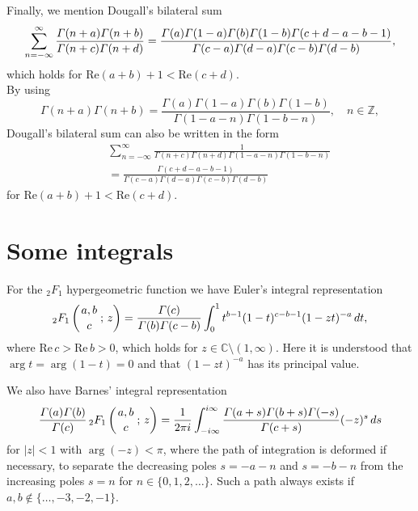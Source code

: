 \documentclass[envcountchap,graybox]{svmono}
\newcounter{rom}
\newcommand{\hyp}[5]{\mbox{}_{#1}{F}_{#2}
\left(\genfrac{}{}{0pt}{}{#3}{#4}\,;\,#5\right)}
\renewcommand{\Gamma}{\varGamma}
\begin{document}
Finally, we mention Dougall's bilateral sum
\begin{equation}
\label{Dougall1}\index{Dougall's bilateral sum}\index{Summation formula!Dougall}
\sum_{n=-\infty}^{\infty}\frac{\Gamma(n+a)\Gamma(n+b)}{\Gamma(n+c)\Gamma(n+d)}
=\frac{\Gamma(a)\Gamma(1-a)\Gamma(b)\Gamma(1-b)\Gamma(c+d-a-b-1)}
{\Gamma(c-a)\Gamma(d-a)\Gamma(c-b)\Gamma(d-b)},
\end{equation}
which holds for $\textrm{Re}(a+b)+1<\textrm{Re}(c+d)$.\\
By using
$$\Gamma(n+a)\Gamma(n+b)=\frac{\Gamma(a)\Gamma(1-a)\Gamma(b)\Gamma(1-b)}
{\Gamma(1-a-n)\Gamma(1-b-n)},\quad n\in\mathbb{Z},$$
Dougall's bilateral sum can also be written in the form
\begin{eqnarray}
\label{Dougall2}
& &\sum_{n=-\infty}^{\infty}\frac{1}{\Gamma(n+c)\Gamma(n+d)\Gamma(1-a-n)\Gamma(1-b-n)}\nonumber\\
& &{}=\frac{\Gamma(c+d-a-b-1)}{\Gamma(c-a)\Gamma(d-a)\Gamma(c-b)\Gamma(d-b)}
\end{eqnarray}
for $\textrm{Re}(a+b)+1<\textrm{Re}(c+d)$.

\section{Some integrals}
\par\setcounter{equation}{0}
\label{integals1}

For the ${}_2F_1$ hypergeometric function we have Euler's integral representation
\begin{equation}
\label{Eulerint}\index{Euler's integral representation for a ${}_2F_1$}
\index{Hypergeometric function!Euler's integral representation}
\hyp{2}{1}{a,b}{c}{z}=\frac{\Gamma(c)}{\Gamma(b)\Gamma(c-b)}
\int_0^1t^{b-1}(1-t)^{c-b-1}(1-zt)^{-a}\,dt,
\end{equation}
where $\textrm{Re}\,c>\textrm{Re}\,b>0$, which holds for $z\in\mathbb{C}\setminus(1,\infty)$.
Here it is understood that $\arg t=\arg(1-t)=0$ and that $(1-zt)^{-a}$ has its
principal value.

We also have Barnes' integral representation
\begin{equation}
\label{Barnes}\index{Barnes' integral representation}
\index{Hypergeometric function!Barnes' integral representation}
\frac{\Gamma(a)\Gamma(b)}{\Gamma(c)}\,\hyp{2}{1}{a,b}{c}{z}=\frac{1}{2\pi i}
\int_{-i\infty}^{i\infty}\frac{\Gamma(a+s)\Gamma(b+s)\Gamma(-s)}{\Gamma(c+s)}(-z)^s\,ds
\end{equation}
for $|z|<1$ with $\arg(-z)<\pi$, where the path of integration is deformed
if necessary, to separate the decreasing poles $s=-a-n$ and $s=-b-n$ from the
increasing poles $s=n$ for $n\in\{0,1,2,\ldots\}$. Such a path always exists if
$a,b\notin\{\ldots,-3,-2,-1\}$.
\end{document}
